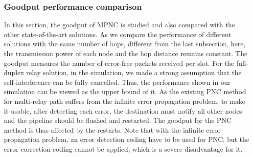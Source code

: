 \fi




\subsubsection{Goodput performance comparison} %
\label{sub:throughput}
In this section, the goodput of MPNC is studied and also compared with the other state-of-the-art solutions. As we compare the performance of different solutions with the same number of hops, different from the last subsection, here, the transmission power of each node and the hop distance remains constant. %
The goodput measures the number of error-free packets received per slot.
For the full-duplex relay solution, in the simulation, we made a strong assumption that the self-interference can be fully cancelled. Thus, the performance shown in our simulation can be viewed as the upper bound of it. 
As the existing PNC method for multi-relay path suffers from the infinite error propagation problem, to make it usable, after detecting each error, the destination must  notify all other nodes and the pipeline should be   flushed and restarted. The goodput for the PNC method is thus affected by the restarts.
Note that with the infinite error propagation problem, an error detection coding have to be used for PNC, but the error correction coding cannot be applied, which is a severe disadvantage for it. 
 
